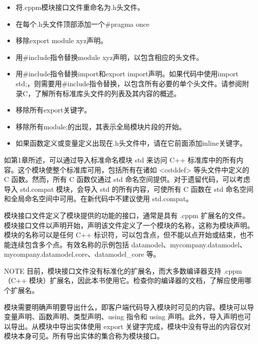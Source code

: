 \begin{itemize}
\item
将.cppm模块接口文件重命名为.h头文件。

\item
在每个.h头文件顶部添加一个\#pragma once

\item
移除export module xyz声明。

\item
用\#include指令替换module xyz声明，以包含相应的头文件。

\item
用\#include指令替换import和export import声明。如果代码中使用import std;，则需要用\#include指令替换，以包含所有必要的单个头文件。请参阅附录C，了解所有标准库头文件的列表及其内容的概述。

\item
移除所有export关键字。

\item
移除所有module;的出现，其表示全局模块片段的开始。

\item
如果函数定义或变量定义出现在.h头文件中，请在它前面添加inline关键字。
\end{itemize}



如第1章所述，可以通过导入标准命名模块 std 来访问 C++ 标准库中的所有内容。这个模块使整个标准库可用，包括所有在诸如 <cstddef> 等头文件中定义的 C 函数。然而，所有 C 函数仅通过 std 命名空间提供。对于遗留代码，可以考虑导入 std.compat 模块，会导入 std 的所有内容，可使所有 C 函数在 std 命名空间和全局命名空间中可用。在新代码中不建议使用 std.compat。


模块接口文件定义了模块提供的功能的接口，通常是具有 .cppm 扩展名的文件。模块接口文件以声明开始，声明该文件定义了一个模块的名称，这称为模块声明。模块的名称可以是任何 C++ 标识符，可以包含点，但不能以点开始或结束，也不能连续包含多个点。有效名称的示例包括 datamodel、mycompany.datamodel、mycompany.datamodel.core、datamodel\_core 等。

\begin{myNotic}{NOTE}
目前，模块接口文件没有标准化的扩展名，而大多数编译器支持 .cppm（C++ 模块）扩展名，因此本书使用它。检查你的编译器的文档，了解应使用哪个扩展名。
\end{myNotic}

模块需要明确声明要导出什么，即客户端代码导入模块时可见的内容。模块可以导变量声明、函数声明、类型声明、using 指令和 using 声明。此外，导入声明也可以导出。从模块中导出实体使用 export 关键字完成，模块中没有导出的内容仅对模块本身可见。所有导出实体的集合称为模块接口。

